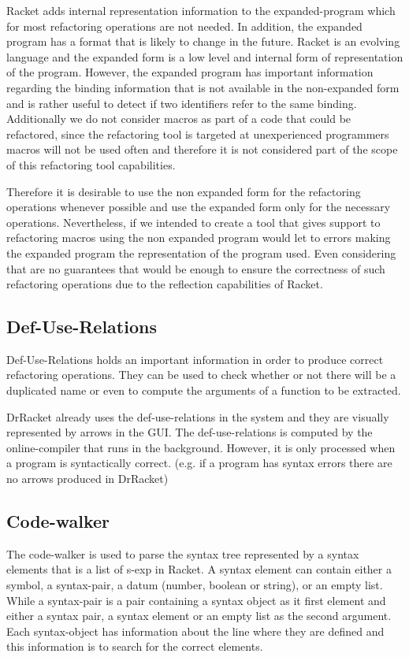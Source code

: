Racket adds internal representation information to the expanded-program which for
most refactoring operations are not needed.
In addition, the expanded program has a format that is likely to change
in the future.
Racket is an evolving language and the expanded form is a low level and internal
form of representation of the program.
However, the expanded program has important information regarding the binding
information that is not available in the non-expanded form and is rather useful
to detect if two identifiers refer to the same binding.
Additionally we do not consider macros as part of a code that could be refactored,
 since the refactoring tool is targeted at unexperienced programmers macros
will not be used often and therefore it is not considered part of the scope of
this refactoring tool capabilities.

Therefore it is desirable to use the non expanded form for the refactoring %
operations whenever possible and use the expanded form only for the necessary
operations.
Nevertheless, if we intended to create a tool that gives support to refactoring macros
using the non expanded program would let to errors making the expanded program the
representation of the program used.
Even considering that are no guarantees that would be enough to ensure the correctness of
such refactoring operations due to the reflection capabilities of Racket.


\subsection{Def-Use-Relations}
Def-Use-Relations holds an important information in order to produce correct refactoring operations. %
They can be used to check whether or not there will be a duplicated name
or even to compute the arguments of a function to be extracted.

DrRacket already uses the def-use-relations in the system and they are visually  %
represented by arrows in the GUI.
The def-use-relations is computed by the online-compiler that runs in the background.
However, it is only processed when a program is syntactically correct. (e.g. if
a program has syntax errors there are no arrows produced in DrRacket)

\subsection{Code-walker}
The code-walker is used to parse the syntax tree represented by a syntax elements
that is a list of s-exp in Racket. %
A syntax element can contain either a symbol, a syntax-pair, a datum (number, boolean or string),
or an empty list. %
While a syntax-pair is a pair containing a syntax object as it first element and
either a syntax pair, a syntax element or an empty list as the second argument.
Each syntax-object has information about the line where they are defined and this
information is to search for the correct elements.


